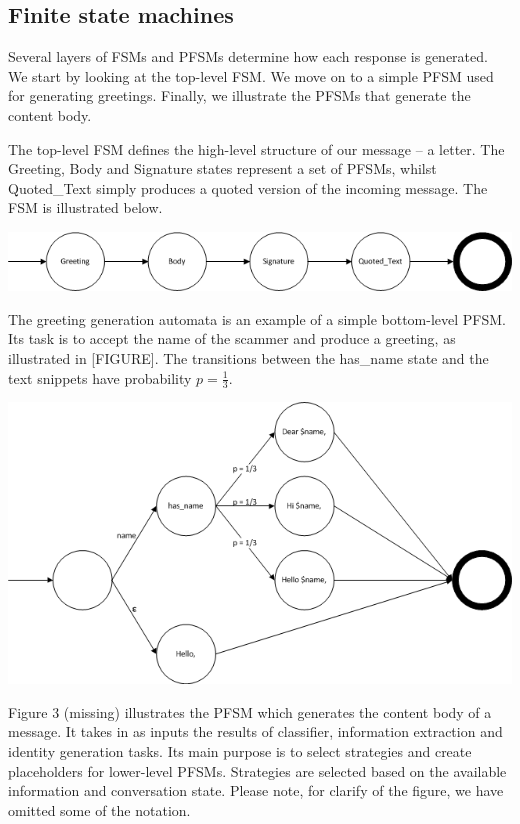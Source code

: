 \subsection{Finite state machines}

Several layers of FSMs and PFSMs determine how each response is generated. We start by looking at the top-level FSM. We move on to a simple PFSM used for generating greetings. Finally, we illustrate the PFSMs that generate the content body.

The top-level FSM defines the high-level structure of our message -- a letter. The Greeting, Body and Signature states represent a set of PFSMs, whilst Quoted\_Text simply produces a quoted version of the incoming message. The FSM is illustrated below.

\includegraphics[scale=0.80]{fsm-top-level.png}

The greeting generation automata is an example of a simple bottom-level PFSM. Its task is to accept the name of the scammer and produce a greeting, as illustrated in [FIGURE]. The transitions between the has\_name state and the text snippets have probability $p = \frac{1}{3}$.

\includegraphics[scale=0.60]{pfsm-greeting.png}

Figure 3 (missing) illustrates the PFSM which generates the content body of a message. It takes in as inputs the results of classifier, information extraction and identity generation tasks. Its main purpose is to select strategies and create placeholders for lower-level PFSMs. Strategies are selected based on the available information and conversation state. Please note, for clarify of the figure, we have omitted some of the notation.

